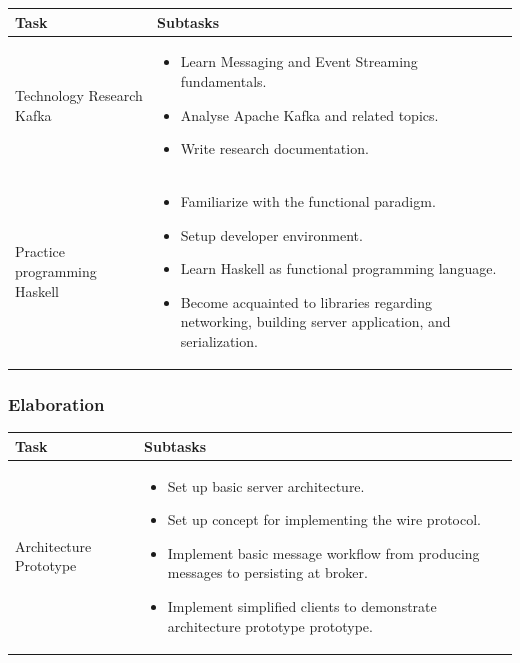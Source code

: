 \begin{tabular}[H]{|p{6cm}|p{10cm}|}\hline
    \textbf{Task} & \textbf{Subtasks} \\ \hline
    Technology Research Kafka & 
        \begin{itemize}
            \item Learn Messaging and Event Streaming fundamentals.
            \item Analyse Apache Kafka and related topics. 
            \item Write research documentation.
        \end{itemize} \\ \hline
    Practice programming Haskell & 
        \begin{itemize}
            \item Familiarize with the functional paradigm.
            \item Setup developer environment. 
            \item Learn Haskell as functional programming language.
            \item Become acquainted to libraries regarding networking,
              building server application, and serialization.
        \end{itemize} \\ \hline
\end{tabular}

\subsubsection{Elaboration}
\begin{tabular}[H]{|p{6cm}|p{10cm}|}\hline
   \textbf{Task} & \textbf{Subtasks} \\ \hline
    Architecture Prototype &
        \begin{itemize}
            \item Set up basic server architecture.
            \item Set up concept for implementing the wire protocol.
            \item Implement basic message workflow from producing messages to
            persisting at broker.
            \item Implement simplified clients to demonstrate architecture
                prototype prototype.
        \end{itemize} \\ \hline
   \end{tabular}

